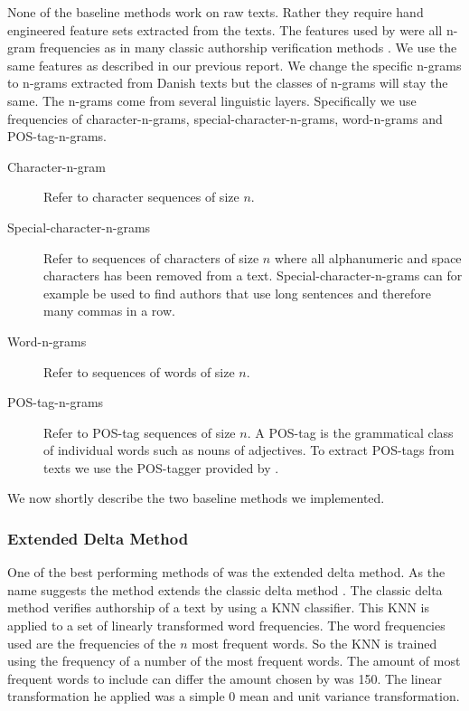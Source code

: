 None of the baseline methods work on raw texts. Rather they require hand
engineered feature sets extracted from the texts. The features used by
\citet{US} were all n-gram frequencies as in many classic authorship
verification methods \citep{stamatos2009}. We use the same features as
described in our previous report. We change the specific n-grams to n-grams
extracted from Danish texts but the classes of n-grams will stay the same.
The n-grams come from several linguistic layers. Specifically we use
frequencies of character-n-grams, special-character-n-grams, word-n-grams and
\gls{POS}-tag-n-grams.

\begin{description}

    \item[Character-n-gram]

        Refer to character sequences of size $n$.

    \item[Special-character-n-grams]

        Refer to sequences of characters of size $n$ where all alphanumeric and
        space characters has been removed from a text. Special-character-n-grams
        can for example be used to find authors that use long sentences and
        therefore many commas in a row.

    \item[Word-n-grams]

        Refer to sequences of words of size $n$.

    \item[\gls{POS}-tag-n-grams]

        Refer to \gls{POS}-tag sequences of size $n$. A \gls{POS}-tag is the
        grammatical class of individual words such as nouns of adjectives. To
        extract \gls{POS}-tags from texts we use the \gls{POS}-tagger provided
        by \citep{polyglot}.

\end{description}

We now shortly describe the two baseline methods we implemented.

\subsubsection{Extended Delta Method}

One of the best performing methods of \citet{US} was the extended delta
method. As the name suggests the method extends the classic delta method
\citep{evert2015towards}. The classic delta method verifies authorship of a text
by using a \gls{KNN} classifier. This \gls{KNN} is applied to a set of linearly
transformed word frequencies. The word frequencies used are the frequencies of
the $n$ most frequent words. So the \gls{KNN} is trained using the frequency
of a number of the most frequent words. The amount of most frequent words to
include can differ the amount chosen by \citep{evert2015towards} was 150.
The linear transformation he applied was a simple 0 mean and unit variance
transformation.

